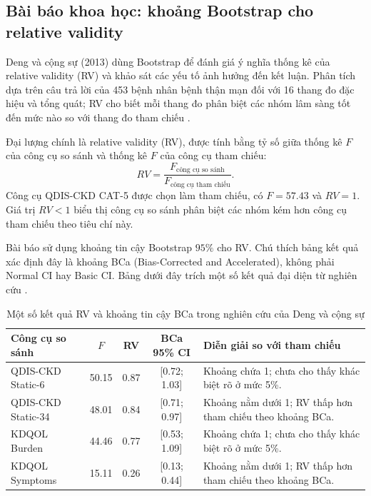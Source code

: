 \subsection{Bài báo khoa học: khoảng Bootstrap cho relative validity}

Deng và cộng sự (2013) dùng Bootstrap để đánh giá ý nghĩa thống kê của
relative validity (RV) và khảo sát các yếu tố ảnh hưởng đến kết luận.
Phân tích dựa trên câu trả lời của 453 bệnh nhân bệnh thận mạn đối với 16
thang đo đặc hiệu và tổng quát; RV cho biết mỗi thang đo phân biệt các
nhóm lâm sàng tốt đến mức nào so với thang đo tham chiếu \cite{deng2013}.

Đại lượng chính là relative validity (RV), được tính bằng tỷ số giữa
thống kê $F$ của công cụ so sánh và thống kê $F$ của công cụ tham chiếu:
\[
RV =
\frac{F_{\text{công cụ so sánh}}}
{F_{\text{công cụ tham chiếu}}}.
\]
Công cụ QDIS-CKD CAT-5 được chọn làm tham chiếu, có $F=57.43$ và
$RV=1$. Giá trị $RV<1$ biểu thị công cụ so sánh phân biệt các nhóm kém
hơn công cụ tham chiếu theo tiêu chí này.

Bài báo sử dụng khoảng tin cậy Bootstrap $95\%$ cho RV. Chú thích bảng
kết quả xác định đây là khoảng BCa (Bias-Corrected and Accelerated),
không phải Normal CI hay Basic CI. Bảng dưới đây trích một số kết quả
đại diện từ nghiên cứu \cite{deng2013}.

\begin{table}[htbp]
	\centering
	\small
	\renewcommand{\arraystretch}{1.2}
	\caption{Một số kết quả RV và khoảng tin cậy BCa trong nghiên cứu của Deng và cộng sự}
	\label{tab:deng-bca}
	\begin{tabularx}{\textwidth}{l c c c X}
		\toprule
		\textbf{Công cụ so sánh} &
		\textbf{$F$} &
		\textbf{RV} &
		\textbf{BCa 95\% CI} &
		\textbf{Diễn giải so với tham chiếu} \\
		\midrule
		QDIS-CKD Static-6 & 50.15 & 0.87 & [0.72; 1.03] &
		Khoảng chứa 1; chưa cho thấy khác biệt rõ ở mức 5\%. \\
		
		QDIS-CKD Static-34 & 48.01 & 0.84 & [0.71; 0.97] &
		Khoảng nằm dưới 1; RV thấp hơn tham chiếu theo khoảng BCa. \\
		
		KDQOL Burden & 44.46 & 0.77 & [0.53; 1.09] &
		Khoảng chứa 1; chưa cho thấy khác biệt rõ ở mức 5\%. \\
		
		KDQOL Symptoms & 15.11 & 0.26 & [0.13; 0.44] &
		Khoảng nằm dưới 1; RV thấp hơn tham chiếu theo khoảng BCa. \\
		\bottomrule
	\end{tabularx}
\end{table}

